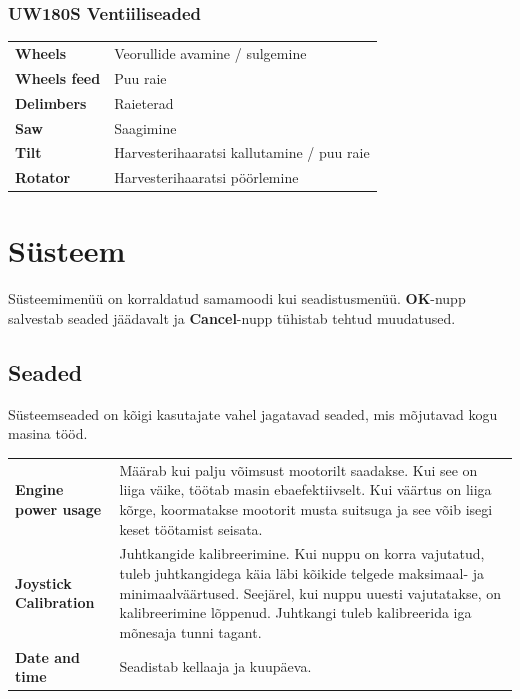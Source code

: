 \documentclass[12pt,a4paper,english]{uvmanual}
\begin{document}
\FloatBarrier
\subsection{UW180S Ventiiliseaded}\label{ch:settings_uw180s_valves}



\begin{tabular}{ L{0.2\textwidth} L{0.66\textwidth} }
\textbf{Wheels} & Veorullide avamine / sulgemine \\
\textbf{Wheels feed} & Puu raie \\
\textbf{Delimbers} & Raieterad \\
\textbf{Saw} & Saagimine \\
\textbf{Tilt} & Harvesterihaaratsi kallutamine / puu raie \\
\textbf{Rotator} & Harvesterihaaratsi pöörlemine \\
\end{tabular}

\chapter{Süsteem}\label{ch:system}

Süsteemimenüü on korraldatud samamoodi kui seadistusmenüü. \textbf{OK}-nupp salvestab seaded jäädavalt ja \textbf{Cancel}-nupp tühistab tehtud muudatused.

\section{Seaded}\label{ch:system_settings}

Süsteemseaded on kõigi kasutajate vahel jagatavad seaded, mis mõjutavad kogu masina tööd.



\begin{tabular}{ L{0.2\textwidth} L{0.66\textwidth} }
\textbf{Engine power usage} & Määrab kui palju võimsust mootorilt saadakse. Kui see on liiga väike, töötab masin ebaefektiivselt. Kui väärtus on liiga kõrge, koormatakse mootorit musta suitsuga ja see võib isegi keset töötamist seisata. \\
\textbf{Joystick Calibration} & Juhtkangide kalibreerimine. Kui nuppu on korra vajutatud, tuleb juhtkangidega käia läbi kõikide telgede maksimaal- ja minimaalväärtused. Seejärel, kui nuppu uuesti vajutatakse, on kalibreerimine lõppenud. Juhtkangi tuleb kalibreerida iga mõnesaja tunni tagant.  \\
\textbf{Date and time} & Seadistab kellaaja ja kuupäeva. \\
\end{tabular}
\end{document}
